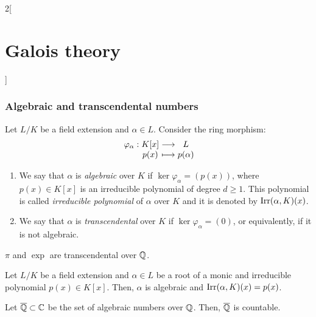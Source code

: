\documentclass[../../../main.tex]{subfiles}
\begin{document}
\begin{multicols}{2}[\section{Galois theory}]
  \subsubsection{Algebraic and transcendental numbers}
  \begin{definition}
    Let $L/K$ be a field extension and $\alpha\in L$. Consider the ring morphism: $$\function{\varphi_\alpha}{K[x]}{L}{p(x)}{p(\alpha)}$$
    \begin{enumerate}
      \item We say that $\alpha$ is \emph{algebraic} over $K$ if $\ker\varphi_\alpha=(p(x))$, where $p(x)\in K[x]$ is an irreducible polynomial of degree $d\geq 1$. This polynomial is called \emph{irreducible polynomial} of $\alpha$ over $K$ and it is denoted by $\operatorname{Irr}(\alpha,K)(x)$.
      \item We say that $\alpha$ is \emph{transcendental} over $K$ if $\ker\varphi_\alpha=(0)$, or equivalently, if it is not algebraic.
    \end{enumerate}
  \end{definition}
  \begin{proposition}
    $\pi$ and $\exp{}$ are transcendental over $\mathbb{Q}$.
  \end{proposition}
  \begin{proposition}
    Let $L/K$ be a field extension and $\alpha\in L$ be a root of a monic and irreducible polynomial $p(x)\in K[x]$. Then, $\alpha$ is algebraic and $\operatorname{Irr}(\alpha,K)(x)=p(x)$.
  \end{proposition}
  \begin{theorem}
    Let $\overline{\mathbb{Q}}\subset\mathbb{C}$ be the set of algebraic numbers over $\mathbb{Q}$. Then, $\overline{\mathbb{Q}}$ is countable.
  \end{theorem}

\end{multicols}
\end{document}
